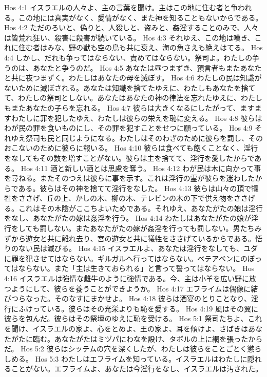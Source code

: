 Hos 4:1  イスラエルの人々よ、主の言葉を聞け。主はこの地に住む者と争われる。この地には真実がなく、愛情がなく、また神を知ることもないからである。
Hos 4:2  ただのろいと、偽りと、人殺しと、盗みと、姦淫することのみで、人々は皆荒れ狂い、殺害に殺害が続いている。
Hos 4:3  それゆえ、この地は嘆き、これに住む者はみな、野の獣も空の鳥も共に衰え、海の魚さえも絶えはてる。
Hos 4:4  しかし、だれも争ってはならない、責めてはならない。祭司よ。わたしの争うのは、あなたと争うのだ。
Hos 4:5  あなたは昼つまずき、預言者もまたあなたと共に夜つまずく。わたしはあなたの母を滅ぼす。
Hos 4:6  わたしの民は知識がないために滅ぼされる。あなたは知識を捨てたゆえに、わたしもあなたを捨てて、わたしの祭司としない。あなたはあなたの神の律法を忘れたゆえに、わたしもまたあなたの子らを忘れる。
Hos 4:7  彼らは大きくなるにしたがって、ますますわたしに罪を犯したゆえ、わたしは彼らの栄えを恥に変える。
Hos 4:8  彼らはわが民の罪を食いものにし、その罪を犯すことをせつに願っている。
Hos 4:9  それゆえ祭司も民と同じようになる。わたしはそのわざのために彼らを罰し、そのおこないのために彼らに報いる。
Hos 4:10  彼らは食べても飽くことなく、淫行をなしてもその数を増すことがない。彼らは主を捨てて、淫行を愛したからである。
Hos 4:11  酒と新しい酒とは思慮を奪う。
Hos 4:12  わが民は木に向かって事を尋ねる。またそのつえは彼らに事を示す。これは淫行の霊が彼らを迷わしたからである。彼らはその神を捨てて淫行をなした。
Hos 4:13  彼らは山々の頂で犠牲をささげ、丘の上、かしの木、柳の木、テレビンの木の下で供え物をささげる。これはその木陰がここちよいためである。それゆえ、あなたがたの娘は淫行をなし、あなたがたの嫁は姦淫を行う。
Hos 4:14  わたしはあなたがたの娘が淫行をしても罰しない。またあなたがたの嫁が姦淫を行っても罰しない。男たちみずから遊女と共に離れ去り、宮の遊女と共に犠牲をささげているからである。悟りのない民は滅びる。
Hos 4:15  イスラエルよ、あなたは淫行をなしても、ユダに罪を犯させてはならない。ギルガルへ行ってはならない。ベテアベンにのぼってはならない。また「主は生きておられる」と言って誓ってはならない。
Hos 4:16  イスラエルは強情な雌牛のように強情である。今、主は小羊を広い野に放つようにして、彼らを養うことができようか。
Hos 4:17  エフライムは偶像に結びつらなった。そのなすにまかせよ。
Hos 4:18  彼らは酒宴のとりことなり、淫行にふけっている。彼らはその光栄よりも恥を愛する。
Hos 4:19  風はその翼に彼らを包んだ。彼らはその祭壇のゆえに恥を受ける。
Hos 5:1  祭司たちよ、これを聞け、イスラエルの家よ、心をとめよ、王の家よ、耳を傾けよ、さばきはあなたがたに臨む。あなたがたはミヅパにわなを設け、タボルの上に網を張ったからだ。
Hos 5:2  彼らはシッテムの穴を深くしたが、わたしは彼らをことごとく懲らしめる。
Hos 5:3  わたしはエフライムを知っている。イスラエルはわたしに隠れることがない。エフライムよ、あなたは今淫行をなし、イスラエルは汚された。
